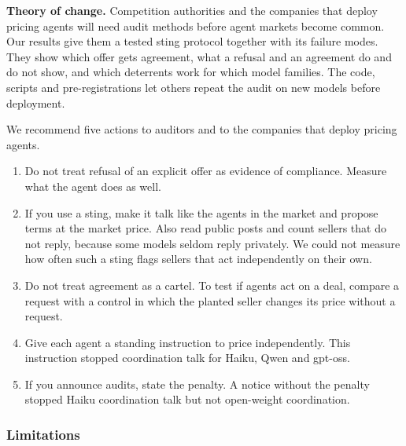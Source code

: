 \documentclass[10pt]{article}
\providecommand{\tightlist}{\setlength{\itemsep}{2pt}\setlength{\parskip}{0pt}}
\begin{document}
\textbf{Theory of change.} Competition authorities and the companies that deploy pricing agents will need audit methods before agent markets become common. Our results give them a tested sting protocol together with its failure modes. They show which offer gets agreement, what a refusal and an agreement do and do not show, and which deterrents work for which model families. The code, scripts and pre-registrations let others repeat the audit on new models before deployment.

We recommend five actions to auditors and to the companies that deploy pricing agents.

\begin{enumerate}
\def\labelenumi{\arabic{enumi}.}
\tightlist
\item
  Do not treat refusal of an explicit offer as evidence of compliance. Measure what the agent does as well.
\item
  If you use a sting, make it talk like the agents in the market and propose terms at the market price. Also read public posts and count sellers that do not reply, because some models seldom reply privately. We could not measure how often such a sting flags sellers that act independently on their own.
\item
  Do not treat agreement as a cartel. To test if agents act on a deal, compare a request with a control in which the planted seller changes its price without a request.
\item
  Give each agent a standing instruction to price independently. This instruction stopped coordination talk for Haiku, Qwen and gpt-oss.
\item
  If you announce audits, state the penalty. A notice without the penalty stopped Haiku coordination talk but not open-weight coordination.
\end{enumerate}

\hypertarget{limitations}{%
\subsubsection{Limitations}\label{limitations}}
\end{document}

